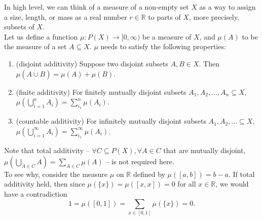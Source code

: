 \documentclass[letterpaper, 11pt]{article}
\newcommand{\R}{\mathbb{R}}   %
\newcommand{\1}{\mathds{1}}		%
\theoremstyle{definition}
\begin{document}
In high level, we can think of a measure of a non-empty set $X$ as a way to assign a size, length, or mass as a real number $r \in \R$ to parts of $X$, more precisely, subsets of $X$. \\
Let us define a function $\mu : P(X) \to [0, \infty)$ be a measure of $X$, and $\mu(A)$ to be the measure of a set $A \subseteq X$. $\mu$ needs to satisfy the following properties:
\begin{enumerate}
    \item (disjoint additivity) Suppose two disjoint subsets $A, B \in X$. Then $\mu(A \dot{\cup} B) = \mu(A) + \mu(B)$.
    \item (finite additivity) For finitely mutually disjoint subsets  $A_1, A_2, ..., A_n \subseteq X$, $\mu(\bigcup_{i=1}^n A_i) = \sum_{i_1}^{n}\mu(A_i)$.
    \item (countable additivity) For infinitely mutually disjoint subsets $A_1, A_2, ... \subseteq X$, $\mu(\bigcup_{i=1}^{\infty} A_i) = \sum_{i_1}^{\infty}\mu(A_i)$.
\end{enumerate}
Note that total additivity -- $\forall  C \subseteq P(X), \forall A \in C$ that are mutually disjoint, $\mu(\bigcup_{A \in C}A) = \sum_{A \in C} \mu(A)$ -- is not required here. \\
To see why, consider the measure $\mu$ on $\R$ defined by $\mu([a, b]) = b - a$.
If total additivity held, then since $\mu(\{x\}) = \mu([
x,x]) = 0$ for all $x \in \R$, we would have a contradiction
\[
1 = \mu([0, 1]) = \sum_{x \in [0, 1]} \mu(\{x\}) = 0.
\]
\end{document}
